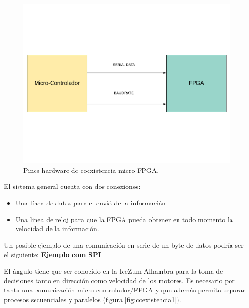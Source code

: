 \begin{figure}[H]
	\center
	\includegraphics[trim = 0mm 40mm 0mm 20mm, clip,scale=0.4]{imagenes/Balancing_robot/coexistencia2.pdf}
	\caption{Pines hardware de coexistencia micro-FPGA.}
	\label{fig:coexistencia2}
\end{figure}
El sistema general cuenta con dos conexiones:
\begin{itemize}
	\item Una línea de datos para el envió de la información.
	\item Una linea de reloj para que la FPGA pueda obtener en todo momento la velocidad de la información.
\end{itemize}

Un posible ejemplo de una comunicación en serie de un byte de datos podría ser el siguiente: 
\textbf{Ejemplo com SPI}

El ángulo tiene que ser conocido en la IceZum-Alhambra para la toma de decisiones tanto en dirección como velocidad de los motores. Es necesario por tanto una comunicación micro-controlador/FPGA y que además permita separar procesos secuenciales y paralelos (figura \ref{fig:coexistencia1}).

